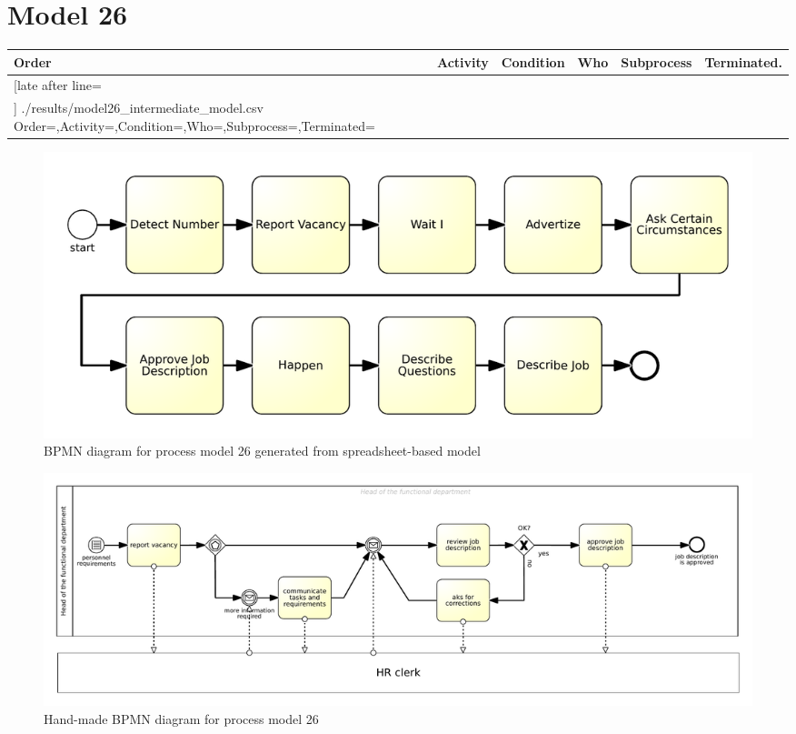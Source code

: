 \section{Model 26}
\begin{tcolorbox}[
	breakable,
	arc=0mm,
	left=1pt,
	right = 1pt,
	boxrule=0mm,
	colback = {white},
	]
	\texttt{}
\end{tcolorbox}
\label{txt:model26}

{\scriptsize
	\begin{longtable}{|p{0.03 \hsize}|p{0.25 \hsize}|p{0.15 \hsize}|p{0.2 \hsize}|p{0.1 \hsize}|p{0.1 \hsize}|}
		\hline
		Order & Activity & Condition & Who & Subprocess & Terminated.
		\\\hline\hline
		\csvreader[late after line=\\\hline]
		{./results/model26_intermediate_model.csv}
		{Order=\Order,Activity=\Activity,Condition=\Condition,Who=\Who,Subprocess=\Subprocess,Terminated=\Terminated}
		{\Order & \Activity & \Condition & \Who & \Subprocess & \Terminated}
		\caption{Spreadsheet-based description for process model 26}
		\label{csv:model26}
	\end{longtable}
}

\begin{figure}[H]
	\centering
	\includegraphics[width=\hsize]{./generated_bpmn/model26.pdf}
	\caption{BPMN diagram for process model 26 generated from spreadsheet-based model}
	\label{bpmn:generated_model26}
\end{figure}

\begin{figure}[H]
	\centering
	\includegraphics[width=\hsize]{./bpmn/model26.pdf}
	\caption{Hand-made BPMN diagram for process model 26}
	\label{bpmn:model26}
\end{figure}

